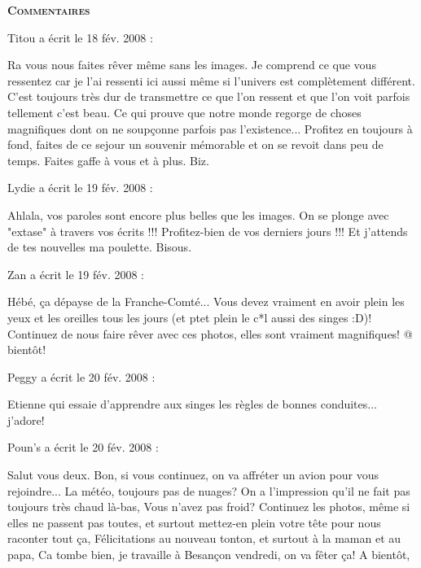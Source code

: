 \bigskip
\textbf{\textsc{Commentaires}}

\medskip
Titou a écrit le 18 fév. 2008 :
\begin{displayquote}
Ra vous nous faites rêver même sans les images. Je comprend ce que vous ressentez car je l'ai ressenti ici aussi même si l'univers est complètement différent. C'est toujours très dur de transmettre ce que l'on ressent et que l'on voit parfois tellement c'est beau. Ce qui prouve que notre monde regorge de choses magnifiques dont on ne soupçonne parfois pas l'existence... Profitez en toujours à fond, faites de ce sejour un souvenir mémorable et on se revoit dans peu de temps. Faites gaffe à vous et à plus. Biz.
\end{displayquote}

\medskip
Lydie a écrit le 19 fév. 2008 :
\begin{displayquote}
Ahlala, vos paroles sont encore plus belles que les images. On se plonge avec "extase" à travers vos écrits !!!
Profitez-bien de vos derniers jours !!! Et j'attends de tes nouvelles ma poulette. Bisous.
\end{displayquote}

\medskip
Zan a écrit le 19 fév. 2008 :
\begin{displayquote}
Hébé, ça dépayse de la Franche-Comté...
Vous devez vraiment en avoir plein les yeux et les oreilles tous les jours (et ptet plein le c*l aussi des singes :D)!
Continuez de nous faire rêver avec ces photos, elles sont vraiment magnifiques!
@ bientôt!
\end{displayquote}

\medskip
Peggy a écrit le 20 fév. 2008 :
\begin{displayquote}
Etienne qui essaie d'apprendre aux singes les règles de bonnes conduites... j'adore!
\end{displayquote}

\medskip
Poun's a écrit le 20 fév. 2008 :
\begin{displayquote}
Salut vous deux. Bon, si vous continuez, on va affréter un avion pour vous rejoindre...
La météo, toujours pas de nuages? On a l'impression qu'il ne fait pas toujours très chaud là-bas, Vous n'avez pas froid?
Continuez les photos, même si elles ne passent pas toutes, et surtout mettez-en plein votre tête pour nous raconter tout ça,
Félicitations au nouveau tonton, et surtout à la maman et au papa,
Ca tombe bien, je travaille à Besançon vendredi, on va fêter ça!
A bientôt,
\end{displayquote}

